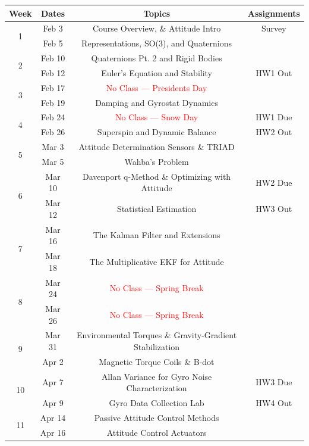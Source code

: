 \documentclass[11pt,letterpaper]{article}
\begin{document}
\begin{tabular}{c|c|c|c}
	Week & Dates & Topics & Assignments \\
	\hline
	\multirow{2}{*}{1} & Feb 3 & 
        Course Overview, \& Attitude Intro & Survey \\
	 & Feb 5 & Representations, SO(3), and Quaternions &  \\
	\hline
	\multirow{2}{*}{2} & Feb 10 &
        Quaternions Pt. 2 and Rigid Bodies &  \\
	 & Feb 12 & Euler's Equation and Stability & HW1 Out \\
	\hline
	\multirow{2}{*}{3} & Feb 17 &
        \textcolor{red}{No Class --- Presidents Day} &  \\
	 & Feb 19 & Damping and Gyrostat Dynamics &  \\
	\hline
	\multirow{2}{*}{4}  & Feb 24 &
        \textcolor{red}{No Class --- Snow Day} & HW1 Due \\
	 & Feb 26 & Superspin and Dynamic Balance & HW2 Out \\
	\hline
	\multirow{2}{*}{5}  & Mar 3 &  Attitude Determination Sensors \& TRIAD &  \\
	 & Mar 5 & Wahba's Problem &  \\
	\hline
	\multirow{2}{*}{6}  & Mar 10 & Davenport q-Method \& Optimizing with Attitude& HW2 Due \\
	 & Mar 12 & Statistical Estimation & HW3 Out \\
	\hline
	\multirow{2}{*}{7}  & Mar 16 & The Kalman Filter and Extensions
         &  \\
	 & Mar 18 & The Multiplicative EKF for Attitude & \\
	\hline
	\multirow{2}{*}{8}  & Mar 24 & 
        \textcolor{red}{No Class --- Spring Break} & \\
	 & Mar 26 & \textcolor{red}{No Class --- Spring Break} &   \\
	\hline
	\multirow{2}{*}{9}  & Mar 31 & Environmental Torques \& Gravity-Gradient Stabilization         &  \\
	 & Apr 2 & Magnetic Torque Coils \& B-dot &  \\
	\hline
	\multirow{2}{*}{10}  & Apr 7 & Allan Variance for Gyro Noise Characterization 
         & HW3 Due \\
	 & Apr 9 & Gyro Data Collection Lab  & HW4 Out  \\
	 \hline
	\multirow{2}{*}{11}  & Apr 14 & Passive Attitude Control Methods
         &  \\
	 & Apr 16 & Attitude Control Actuators &   \\

\end{tabular}
\end{document}
